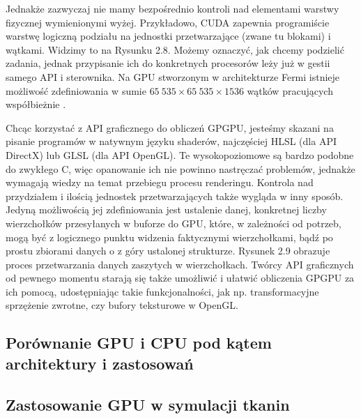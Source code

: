 		
		Jednakże zazwyczaj nie mamy bezpośrednio kontroli nad elementami warstwy fizycznej wymienionymi wyżej. Przykładowo, CUDA zapewnia programiście warstwę logiczną podziału na jednostki przetwarzające (zwane tu blokami) i wątkami. Widzimy to na Rysunku 2.8. Możemy oznaczyć, jak chcemy podzielić zadania, jednak przypisanie ich do konkretnych procesorów leży już w gestii samego API i sterownika. Na GPU stworzonym w architekturze Fermi istnieje możliwość zdefiniowania w sumie \(65\ 535 \times 65\ 535 \times 1536\) wątków pracujących współbieżnie \cite{cuda}.
		
		
		Chcąc korzystać z API graficznego do obliczeń GPGPU, jesteśmy skazani na pisanie programów w natywnym języku shaderów, najczęściej HLSL (dla API DirectX) lub GLSL (dla API OpenGL). Te wysokopoziomowe są bardzo podobne do zwykłego C, więc opanowanie ich nie powinno nastręczać problemów, jednakże wymagają wiedzy na temat przebiegu procesu renderingu. Kontrola nad przydziałem i ilością jednostek przetwarzających także wygląda w inny sposób. Jedyną możliwością jej zdefiniowania jest ustalenie danej, konkretnej liczby wierzchołków przesyłanych w buforze do GPU, które, w zależności od potrzeb, mogą być z logicznego punktu widzenia faktycznymi wierzchołkami, bądź po prostu zbiorami danych o z góry ustalonej strukturze. Rysunek 2.9 obrazuje proces przetwarzania danych zaszytych w wierzchołkach. Twórcy API graficznych od pewnego momentu starają się także umożliwić i ułatwić obliczenia GPGPU za ich pomocą, udostępniając takie funkcjonalności, jak np. transformacyjne sprzężenie zwrotne, czy bufory teksturowe w OpenGL.
		
		\subsection{Porównanie GPU i CPU pod kątem architektury i zastosowań}
		\label{t:teoria:gpu:porownanie}
		
		
		
		
		
		\subsection{Zastosowanie GPU w symulacji tkanin}
		\label{t:teoria:gpu:zalety}
		
